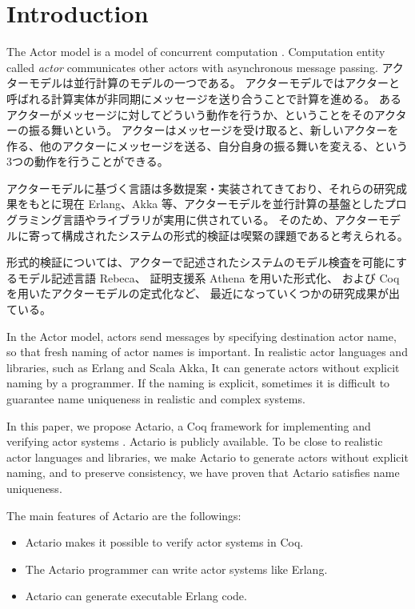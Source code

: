 \section{Introduction}
\label{sec:introduction}

The Actor model is a model of concurrent computation \cite{Agha:1986aa}.
Computation entity called \textit{actor} communicates other actors with asynchronous message passing.
アクターモデルは並行計算のモデルの一つである\cite{Agha:1986aa}。
アクターモデルではアクターと呼ばれる計算実体が非同期にメッセージを送り合うことで計算を進める。
あるアクターがメッセージに対してどういう動作を行うか、ということをそのアクターの振る舞いという。
アクターはメッセージを受け取ると、新しいアクターを作る、他のアクターにメッセージを送る、自分自身の振る舞いを変える、という3つの動作を行うことができる。

アクターモデルに基づく言語は多数提案・実装されてきており、それらの研究成果をもとに現在 Erlang、Akka 等、アクターモデルを並行計算の基盤としたプログラミング言語やライブラリが実用に供されている。
そのため、アクターモデルに寄って構成されたシステムの形式的検証は喫緊の課題であると考えられる。

形式的検証については、アクターで記述されたシステムのモデル検査を可能にするモデル記述言語 Rebeca、
証明支援系 Athena を用いた形式化、
および Coq を用いたアクターモデルの定式化など、
最近になっていくつかの研究成果が出ている。

In the Actor model, actors send messages by specifying destination actor name, so that fresh naming of actor names is important.
In realistic actor languages and libraries, such as Erlang and Scala Akka, It can generate actors without explicit naming by a programmer.
If the naming is explicit, sometimes it is difficult to guarantee name uniqueness in realistic and complex systems.

In this paper, we propose Actario, a Coq framework for implementing and verifying actor systems \cite{Actario}. Actario is publicly available.
To be close to realistic actor languages and libraries, we make Actario to generate actors without explicit naming, and to preserve consistency, we have proven that Actario satisfies name uniqueness.

The main features of Actario are the followings:

\begin{itemize}
\item Actario makes it possible to verify actor systems in Coq.
\item The Actario programmer can write actor systems like Erlang.
\item Actario can generate executable Erlang code.
\end{itemize}

